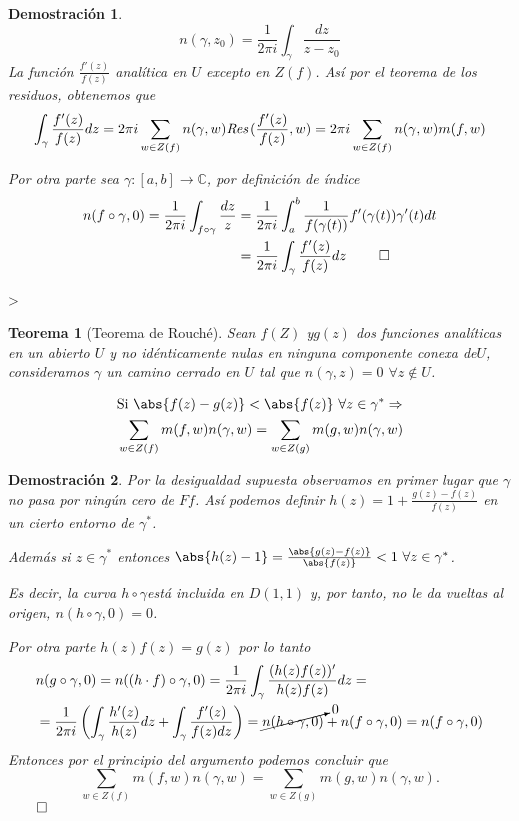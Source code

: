 \documentclass[12pt]{book}
\newtheorem{theorem}{Teorema}[chapter]
\newtheorem*{dem}{Demostración}
\newcommand{\C}{\mathbb{C}}
\newcommand{\Res}{\emph{Res}\hspace{0.5mm}}
\begin{document}
\begin{dem}
$$n(\gamma,z_0) = \frac{1}{2\pi i}\int_\gamma \frac{dz}{z-z_0}$$
La función $\frac{f'(z)}{f(z)}$ analítica en $U$ excepto en $Z(f)$. Así por el teorema de los residuos, obtenemos que 
$$\int_\gamma \frac{f'(z)}{f(z)} dz = 2\pi i \sum_{w\in Z(f)}n(\gamma,w)\Res(\frac{f'(z)}{f(z)},w) = 2\pi i\sum_{w\in Z(f)}n(\gamma,w)m(f,w)$$

Por otra parte  sea $\gamma:[a,b]\to \C$, por definición de índice
\begin{align*}
n(f\circ \gamma,0) = \frac{1}{2\pi i}\int_{f\circ\gamma}\frac{dz}{z}&= \frac{1}{2\pi i}\int_a^b \frac{1}{f(\gamma(t))}f'(\gamma(t))\gamma'(t)dt \\
&= \frac{1}{2\pi i}\int_\gamma \frac{f'(z)}{f(z)}dz\ \qed
\end{align*}
\end{dem}

>
\begin{theorem}[Teorema de Rouché]
Sean $f(Z)$ y$g(z)$ dos funciones analíticas en un abierto $U$ y no idénticamente nulas en ninguna componente conexa de$U$, consideramos $\gamma$ un camino cerrado en $U$ tal que $n(\gamma,z)=0$ $\forall z\notin U$.

\begin{align*}
&\text{Si }\abs{f(z)-g(z)} < \abs{f(z)}\ \forall z\in\gamma^*\Rightarrow  \\
&\sum_{w\in Z(f)}m(f,w)n(\gamma,w) = \sum_{w\in Z(g)}m(g,w)n(\gamma,w)
\end{align*}
\end{theorem}

\begin{dem}
Por la desigualdad supuesta observamos en primer lugar que $\gamma$ no pasa por ningún cero de $Ff$. Así podemos definir $h(z) = 1 +\frac{g(z)-f(z)}{f(z)}$ en un cierto entorno de $\gamma^*$.

Además si $z\in\gamma^*$ entonces $\abs{h(z)-1} =\frac{\abs{g(z)-f(z)}}{\abs{f(z)}}<1\ \forall z\in\gamma^*$.

Es decir, la curva $h\circ\gamma$está incluida en $D(1,1)$ y, por tanto, no le da vueltas al origen, $n(h\circ\gamma,0)=0$.

Por otra parte $h(z) f(z) = g(z)$ por lo tanto
\begin{align*}
&n(g\circ\gamma,0) = n((h\cdot f)\circ \gamma,0) =\frac{1}{2\pi i}\int_\gamma\frac{(h(z)f(z))'}{h(z)f(z)}dz =\\
&=\frac{1}{2\pi i}\left(\int_\gamma\frac{h'(z)}{h(z)}dz +\int_\gamma \frac{f'(z)}{f(z)dz} \right)= \cancelto{0}{n(h\circ\gamma,0)} + n(f\circ\gamma,0) = n(f\circ\gamma,0)  
\end{align*}
Entonces por el principio del argumento podemos concluir que $$\sum_{w\in Z(f)}m(f,w)n(\gamma,w) = \sum_{w\in Z(g)}m(g,w)n(\gamma,w).$$ $\qed$
\end{dem}
\end{document}
